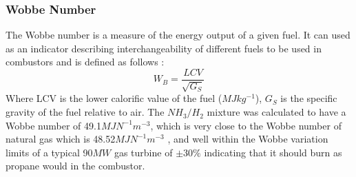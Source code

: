 \subsubsection{Wobbe Number} 
The Wobbe number is a measure of the energy output of a given fuel. It can used as an indicator describing interchangeability of different fuels to be used in combustors and is defined as follows \cite{website:wobbe}: 
\begin{equation}
W_B = \frac{LCV}{\sqrt{G_S}}
\end{equation}
Where LCV is the lower calorific value of the fuel ($MJ kg^{-1}$), $G_S$ is the specific gravity of the fuel relative to air. The $NH_3/H_2$ mixture was calculated to have a Wobbe number of 49.1$MJN^{-1}m^{-3}$, which is very close to the Wobbe number of natural gas which is 48.52$MJN^{-1}m^{-3}$ \cite{website:wobbe}, and well within the Wobbe variation limits of a typical 90$MW$ gas turbine of $\pm 30\%$ \cite{PDF:GE} indicating that it should burn as propane would in the combustor. 

